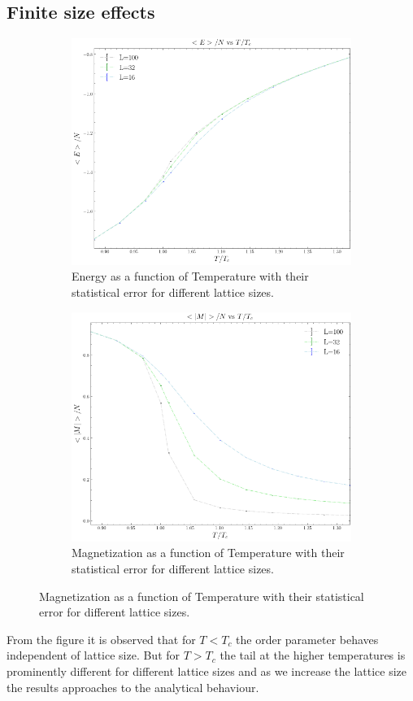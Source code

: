\documentclass[article]{revtex4}
\begin{document}
\subsection{Finite size effects}

\begin{figure}[h!]
\begin{subfigure}{.5\textwidth}
  \centering
  \includegraphics[width=0.7\linewidth]{E_vs_T_L.png}
  \caption{Energy as a function of Temperature with their statistical error for different lattice sizes.}
\end{subfigure}%
\begin{subfigure}{.5\textwidth}
  \centering
  \includegraphics[width=0.7\linewidth]{M_vs_T_L.png}
  \caption{Magnetization as a function of Temperature with their statistical error for different lattice sizes.}
\end{subfigure}
\end{figure}
From the figure it is observed that for $T<T_c$ the order parameter behaves independent of lattice size. But for $T>T_c$
 the tail at the higher temperatures is prominently different for different lattice sizes and as we increase the lattice size the results approaches to the analytical behaviour.\\
\end{document}
